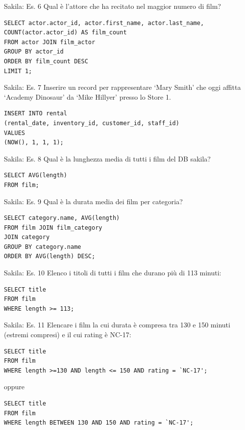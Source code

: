 %
\begin{frame}[fragile]{Sakila: Es. 6}
Qual \`e l'attore che ha recitato nel maggior numero di film?
\pause
\begin{lstlisting}
SELECT actor.actor_id, actor.first_name, actor.last_name,
COUNT(actor.actor_id) AS film_count
FROM actor JOIN film_actor
GROUP BY actor_id
ORDER BY film_count DESC
LIMIT 1;
\end{lstlisting}
\end{frame}
%
\begin{frame}[fragile]{Sakila: Es. 7}
Inserire un record per rappresentare `Mary Smith' che oggi affitta `Academy Dinosaur' da `Mike Hillyer' presso lo Store 1.
\pause
\begin{lstlisting}
INSERT INTO rental
(rental_date, inventory_id, customer_id, staff_id)
VALUES
(NOW(), 1, 1, 1);
\end{lstlisting}
\end{frame}
%
\begin{frame}[fragile]{Sakila: Es. 8}
Qual \`e la lunghezza media di tutti i film del DB sakila?
\pause
\begin{lstlisting}
SELECT AVG(length)
FROM film;
\end{lstlisting}
\end{frame}
%
\begin{frame}[fragile]{Sakila: Es. 9}
Qual \`e la durata media dei film per categoria?
\pause
\begin{lstlisting}
SELECT category.name, AVG(length)
FROM film JOIN film_category
JOIN category
GROUP BY category.name
ORDER BY AVG(length) DESC;
\end{lstlisting}
\end{frame}
%
\begin{frame}[fragile]{Sakila: Es. 10}
Elenco i titoli di tutti i film che durano pi\`u di 113 minuti:
\pause
\begin{lstlisting}
SELECT title
FROM film
WHERE length >= 113;
\end{lstlisting}
\end{frame}
%
\begin{frame}[fragile]{Sakila: Es. 11}
Elencare i film la cui durata \`e compresa tra 130 e 150 minuti (estremi compresi) e il cui rating \`e NC-17:
\pause
\begin{lstlisting}
SELECT title
FROM film
WHERE length >=130 AND length <= 150 AND rating = `NC-17';
\end{lstlisting}
\pause
oppure
\begin{lstlisting}
SELECT title
FROM film
WHERE length BETWEEN 130 AND 150 AND rating = `NC-17';
\end{lstlisting}
\end{frame}
